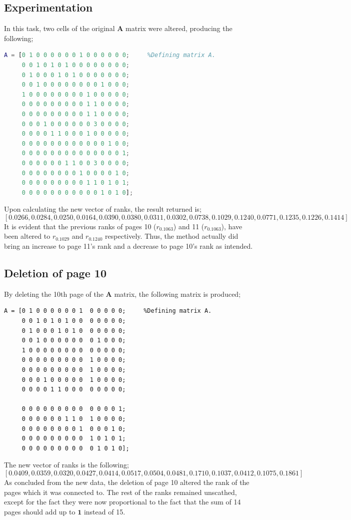 \documentclass{article}
\begin{document}
\subsection{Experimentation}
In this task, two cells of the original $\mathbf{A}$ matrix were altered, producing the following;
\begin{lstlisting}[language=Matlab]
A = [0 1 0 0 0 0 0 0 1 0 0 0 0 0 0;     %Defining matrix A.
     0 0 1 0 1 0 1 0 0 0 0 0 0 0 0;
     0 1 0 0 0 1 0 1 0 0 0 0 0 0 0;
     0 0 1 0 0 0 0 0 0 0 0 1 0 0 0;
     1 0 0 0 0 0 0 0 0 1 0 0 0 0 0;
     0 0 0 0 0 0 0 0 0 1 1 0 0 0 0;
     0 0 0 0 0 0 0 0 0 1 1 0 0 0 0;
     0 0 0 1 0 0 0 0 0 0 3 0 0 0 0;
     0 0 0 0 1 1 0 0 0 1 0 0 0 0 0;
     0 0 0 0 0 0 0 0 0 0 0 0 1 0 0;
     0 0 0 0 0 0 0 0 0 0 0 0 0 0 1;
     0 0 0 0 0 0 1 1 0 0 3 0 0 0 0;
     0 0 0 0 0 0 0 0 1 0 0 0 0 1 0;
     0 0 0 0 0 0 0 0 0 1 1 0 1 0 1;
     0 0 0 0 0 0 0 0 0 0 0 1 0 1 0];
\end{lstlisting}
Upon calculating the new vector of ranks, the result returned is;    
\[[0.0266,0.0284,0.0250,0.0164,0.0390,0.0380,0.0311,0.0302,0.0738,0.1029,0.1240,0.0771,0.1235,0.1226,0.1414]\]
It is evident that the previous ranks of pages 10 ($r_{0.1063}$) and 11 ($r_{0.1063}$), have been altered to $r_{0.1029}$ and $r_{0.1240}$ respectively. Thus, the method actually did bring an increase to page 11's rank and a decrease to page 10's rank as intended.
\subsection{Deletion of page 10}
By deleting the 10th page of the $\mathbf{A}$ matrix, the following matrix is produced;
\begin{lstlisting}
A = [0 1 0 0 0 0 0 0 1  0 0 0 0 0;     %Defining matrix A.
     0 0 1 0 1 0 1 0 0  0 0 0 0 0;
     0 1 0 0 0 1 0 1 0  0 0 0 0 0;
     0 0 1 0 0 0 0 0 0  0 1 0 0 0;
     1 0 0 0 0 0 0 0 0  0 0 0 0 0;
     0 0 0 0 0 0 0 0 0  1 0 0 0 0;
     0 0 0 0 0 0 0 0 0  1 0 0 0 0;
     0 0 0 1 0 0 0 0 0  1 0 0 0 0;
     0 0 0 0 1 1 0 0 0  0 0 0 0 0;
     
     0 0 0 0 0 0 0 0 0  0 0 0 0 1;
     0 0 0 0 0 0 1 1 0  1 0 0 0 0;
     0 0 0 0 0 0 0 0 1  0 0 0 1 0;
     0 0 0 0 0 0 0 0 0  1 0 1 0 1;
     0 0 0 0 0 0 0 0 0  0 1 0 1 0];
\end{lstlisting}
The new vector of ranks is the following;
\[[0.0409,0.0359,0.0320,0.0427,0.0414,0.0517,0.0504,0.0481,0.1710,0.1037,0.0412,0.1075,0.1861]\]
As concluded from the new data, the deletion of page 10 altered the rank of the pages which it was connected to. The rest of the ranks remained unscathed, except for the fact they were now proportional to the fact that the sum of 14 pages should add up to $\mathbf{1}$ instead of 15.
\end{document}
